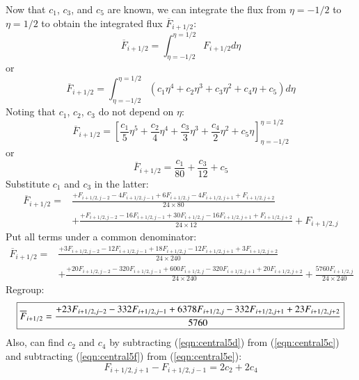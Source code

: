 \documentclass{warpdoc}
\newcommand\frameeqn[1]{\fbox{$\displaystyle #1$}}
\begin{document}
Now that $c_1$, $c_3$, and $c_5$ are known, we can integrate the flux from $\eta=-1/2$ to $\eta=1/2$ to obtain the integrated flux $\overline{F}_{i+1/2}$:
%
\begin{equation}
\overline{F}_{i+1/2}=\int_{\eta=-1/2}^{\eta=1/2} F_{i+1/2} d\eta
\end{equation}
%
or
%
\begin{equation}
\overline{F}_{i+1/2}=\int_{\eta=-1/2}^{\eta=1/2} \left( c_1 \eta^4 + c_2 \eta^3 + c_3 \eta^2 + c_4 \eta + c_5 \right) d\eta
\end{equation}
%
Noting that $c_1$, $c_2$, $c_3$ do not depend on $\eta$:
%
\begin{equation}
\overline{F}_{i+1/2}= \left[ \frac{c_1}{5} \eta^5 + \frac{c_2}{4} \eta^4 + \frac{c_3}{3} \eta^3 + \frac{c_4}{2} \eta^2 + c_5 \eta \right]_{\eta=-1/2}^{\eta=1/2}
\end{equation}
%
or
%
\begin{equation}
\overline{F}_{i+1/2}=  \frac{c_1}{80}  + \frac{c_3}{12}   + c_5  
\end{equation}
%
Substitute $c_1$ and $c_3$ in the latter:
%
\begin{align}
\overline{F}_{i+1/2}= & \frac{+F_{i+1/2,j-2} -4 F_{i+1/2,j-1}+ 6 F_{i+1/2,j} -4 F_{i+1/2,j+1} +F_{i+1/2,j+2}}{24\times 80}\nonumber\\
 &+ \frac{+ F_{i+1/2,j-2} -16 F_{i+1/2,j-1}+ 30 F_{i+1/2,j} -16 F_{i+1/2,j+1} +F_{i+1/2,j+2}}{24\times 12}  
 + F_{i+1/2,j} 
\end{align}
%
Put all terms under a common denominator:
%
\begin{align}
\overline{F}_{i+1/2}= & \frac{+3 F_{i+1/2,j-2} -12 F_{i+1/2,j-1}+ 18 F_{i+1/2,j} - 12 F_{i+1/2,j+1} +3F_{i+1/2,j+2}}{24\times 240}\nonumber\\
 &+ \frac{+ 20 F_{i+1/2,j-2} -320 F_{i+1/2,j-1}+ 600 F_{i+1/2,j} -320 F_{i+1/2,j+1} +20 F_{i+1/2,j+2}}{24\times 240}  
 + \frac{ 5760 F_{i+1/2,j}}{24\times 240} 
\end{align}
%
Regroup:
%
\begin{equation}
\frameeqn{
\overline{F}_{i+1/2}=  \frac{+23 F_{i+1/2,j-2} -332 F_{i+1/2,j-1}+ 6378 F_{i+1/2,j} - 332 F_{i+1/2,j+1} + 23 F_{i+1/2,j+2}}{5760}
}
\end{equation}
%
Also, can find $c_2$ and $c_4$ by subtracting (\ref{eqn:central5d}) from (\ref{eqn:central5c}) and subtracting (\ref{eqn:central5f}) from (\ref{eqn:central5e}):
%
\begin{equation}
F_{i+1/2,j+1}-F_{i+1/2,j-1}=2 c_2    + 2 c_4   
\label{eqn:central5k}
\end{equation}
\end{document}
